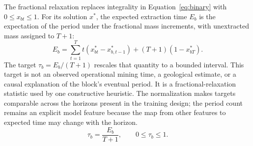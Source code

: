 \documentclass[11pt]{article}
\begin{document}
The fractional relaxation replaces integrality in Equation~\ref{eq:binary} with $0\leq x_{bt}\leq1$. For its solution $x^*$, the expected extraction time $E_b$ is the expectation of the period under the fractional mass increments, with unextracted mass assigned to $T+1$:
\begin{equation}
E_b=\sum_{t=1}^{T}t(x^*_{bt}-x^*_{b,t-1})+(T+1)(1-x^*_{bT}).
\label{eq:expected-time}
\end{equation}
The target $\tau_b=E_b/(T+1)$ rescales that quantity to a bounded interval. This target is not an observed operational mining time, a geological estimate, or a causal explanation of the block's eventual period. It is a fractional-relaxation statistic used by one constructive heuristic. The normalization makes targets comparable across the horizons present in the training design; the period count remains an explicit model feature because the map from other features to expected time may change with the horizon.
\begin{equation}
\tau_b=\frac{E_b}{T+1},\qquad 0\leq\tau_b\leq1.
\label{eq:normalized-target}
\end{equation}
\end{document}

